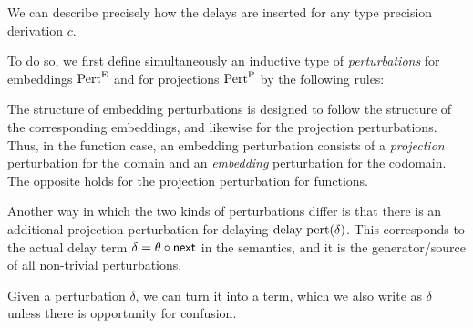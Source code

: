 We can describe precisely how the delays are inserted for any type precision
derivation $c$.

To do so, we first define simultaneously an inductive type of \emph{perturbations}
for embeddings $\text{Pert}^\text{E}$ and for projections $\text{Pert}^\text{P}$ by the following rules:


The structure of embedding perturbations is designed to follow the structure
of the corresponding embeddings, and likewise for the projection perturbations.
Thus, in the function case, an embedding perturbation consists of a \emph{projection}
perturbation for the domain and an \emph{embedding} perturbation for the codomain.
The opposite holds for the projection perturbation for functions.

Another way in which the two kinds of perturbations differ is that there is an additional
projection perturbation for delaying $\text{delay-pert}({\delta})$.
This corresponds to the actual delay term $\delta = \theta \circ \mathsf{next}$ in the semantics,
and it is the generator/source of all non-trivial perturbations.

Given a perturbation $\delta$, we can turn it into a term, which we also write as
$\delta$ unless there is opportunity for confusion.

